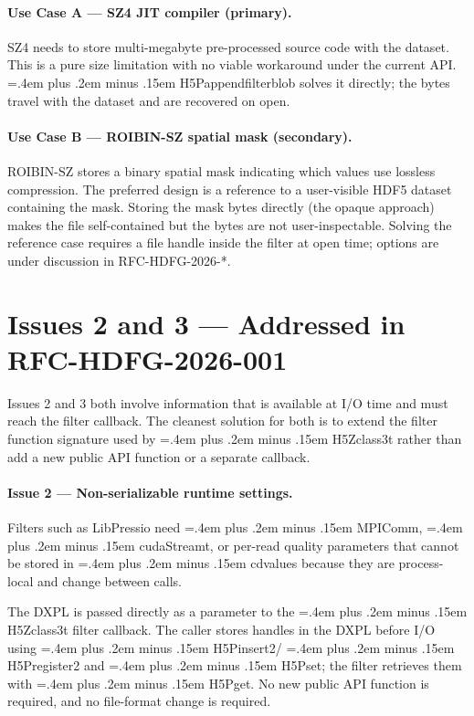 \documentclass[11pt,letterpaper]{article}
\renewcommand{\texttt}[1]{\begingroup\small\ttfamily\hyphenchar\font=45
  \spaceskip=.4em plus .2em minus .15em #1\endgroup}
\renewcommand{\_}{\oldtextunderscore\allowbreak}
\begin{document}
\paragraph{Use Case A --- SZ4 JIT compiler (primary).}
SZ4 needs to store multi-megabyte pre-processed source code with the dataset.
This is a pure size limitation with no viable workaround under the current API.
\texttt{H5Pappend\_filter\_blob} solves it directly; the bytes travel with
the dataset and are recovered on open.

\paragraph{Use Case B --- ROIBIN-SZ spatial mask (secondary).}
ROIBIN-SZ stores a binary spatial mask indicating which values use lossless
compression.  The preferred design is a reference to a user-visible HDF5
dataset containing the mask.  Storing the mask bytes directly (the opaque
approach) makes the file self-contained but the bytes are not
user-inspectable.  Solving the reference case requires a file handle inside
the filter at open time; options are under discussion in RFC-HDFG-2026-*.

\section*{Issues 2 and 3 --- Addressed in RFC-HDFG-2026-001}

Issues 2 and 3 both involve information that is available at I/O time
and must reach the filter callback.  The cleanest solution for both is
to extend the filter function signature used by \texttt{H5Z\_class3\_t}
rather than add a new public API function or a separate callback.

\paragraph{Issue 2 --- Non-serializable runtime settings.}
Filters such as LibPressio need \texttt{MPI\_Comm}, \texttt{cudaStream\_t},
or per-read quality parameters that cannot be stored in \texttt{cd\_values}
because they are process-local and change between calls.

The DXPL is passed directly as a parameter to the \texttt{H5Z\_class3\_t}
filter callback.  The caller stores handles in the DXPL before I/O using
\texttt{H5Pinsert2}/\texttt{H5Pregister2} and \texttt{H5Pset}; the filter
retrieves them with \texttt{H5Pget}.  No new public API function is
required, and no file-format change is required.
\end{document}

